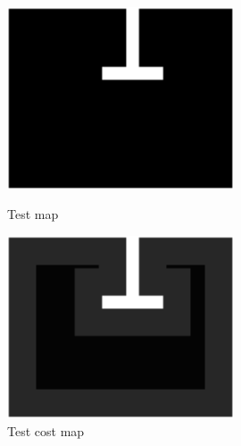 \begin{figure}[H]
    \centering
    \begin{minipage}{.5\textwidth}
        \centering
        \includegraphics[width=0.6\textwidth]{billeder/map}
		\caption{Test map}
		\label{fig:map}
    \end{minipage}%
    \begin{minipage}{0.5\textwidth}
        \centering
        \includegraphics[width=0.6\textwidth]{billeder/costmap}
		\caption{Test cost map}
		\label{fig:costmap}
    \end{minipage}
\end{figure}
